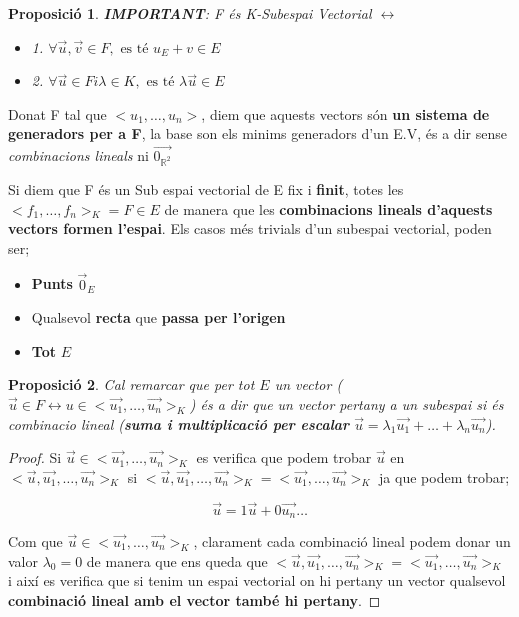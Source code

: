 \documentclass[12pt]{article}
\newtheorem{proposicio}{Proposició}[section]
\newcommand{\R}{\mathbb{R}}
\begin{document}
\begin{proposicio}
    \textbf{IMPORTANT}: F és K-Subespai Vectorial $\leftrightarrow$

\begin{itemize}
    \item 1. $\forall \vec{u}, \vec{v}\in F, \text{ es té } u_E+v \in E$
    \item 2. $\forall \vec{u}\in F i \lambda \in K, \text{ es té } \lambda\vec{u}\in E$
\end{itemize}
\end{proposicio}

Donat F tal que $<u_1,\dots, u_n>$, diem que aquests vectors són \textbf{un sistema de generadors per a F}, la base son els minims generadors d'un E.V, és a dir sense \textit{combinacions lineals} ni \textit{$\vec{0_{\R^2}}$}

Si diem que F és un Sub espai vectorial de E fix i \textbf{finit}, totes les $<f_1,\dots,f_n>_K = F \in E$ de manera que les \textbf{combinacions lineals d'aquests vectors formen l'espai}. Els casos més trivials d'un subespai vectorial, poden ser;

\begin{itemize}
    \item \textbf{Punts} $\vec{0}_{E}$
    \item Qualsevol \textbf{recta} que \textbf{passa per l'origen}
    \item \textbf{Tot} $E$
\end{itemize}

\begin{proposicio}
    Cal remarcar que per tot $E$ un vector ($\vec{u} \in F \leftrightarrow u \in <\vec{u_1}, \dots, \vec{u_n}>_K$) és a dir que un vector pertany a un subespai si és combinacio lineal (\textbf{suma i multiplicació per escalar} $\vec{u} = \lambda_1\vec{u_1} + \dots + \lambda_n\vec{u_n}$).
\end{proposicio}

\begin{proof}
    Si $\vec{u} \in <\vec{u_1}, \dots, \vec{u_n}>_K$ es verifica que podem trobar $\vec{u}$ en $<\vec{u}, \vec{u_1}, \dots, \vec{u_n}>_K$ si $<\vec{u}, \vec{u_1}, \dots, \vec{u_n}>_K = <\vec{u_1}, \dots, \vec{u_n}>_K$ ja que podem trobar;

    \[\vec{u} = 1\vec{u} + 0 \vec{u_n}\dots\]

    Com que $\vec{u} \in <\vec{u_1}, \dots, \vec{u_n}>_K$, clarament cada combinació lineal podem donar un valor $\lambda_0 = 0$ de manera que ens queda que $<\vec{u}, \vec{u_1}, \dots, \vec{u_n}>_K = <\vec{u_1}, \dots, \vec{u_n}>_K$ i així es verifica que si tenim un espai vectorial on hi pertany un vector qualsevol \textbf{combinació lineal amb el vector també hi pertany}.
\end{proof}
\end{document}

